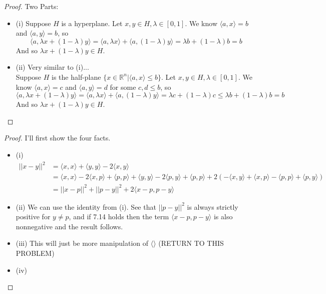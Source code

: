 \documentclass[12pt]{article}
\newenvironment{problem}[2][Problem]{\begin{trivlist}
\item[\hskip \labelsep {\bfseries #1}\hskip \labelsep {\bfseries #2.}]}{\end{trivlist}}
\theoremstyle{definition}
\theoremstyle{definition}
\theoremstyle{definition}
\theoremstyle{definition}
\begin{document}
\begin{problem}{7.2} \begin{proof} Two Parts:
\begin{itemize}
\item (i)
Suppose $H$ is a hyperplane. Let $x, y \in H, \lambda \in [0,1]$. We know $\langle a, x \rangle = b$ and $\langle a, y \rangle = b$, so 
$$ \langle a, \lambda x + (1 - \lambda) y \rangle = \langle a, \lambda x \rangle + \langle a, (1 - \lambda)y \rangle = \lambda b + (1 - \lambda) b = b
$$
And so $\lambda x + (1-\lambda) y \in H$.
\item (ii) Very similar to (i)... \\
Suppose $H$ is the half-plane $\{ x \in \mathbb{R}^n | \langle a, x \rangle \leq b\}$. Let $x, y \in H, \lambda \in [0,1]$. We know $\langle a, x \rangle = c$ and $\langle a, y \rangle = d$ for some $c, d \leq b$, so 
$$ \langle a, \lambda x + (1 - \lambda) y \rangle = \langle a, \lambda x \rangle + \langle a, (1 - \lambda)y \rangle = \lambda c + (1 - \lambda) c \leq \lambda b + (1 - \lambda) b = b
$$
And so $\lambda x + (1-\lambda) y \in H$.
\end{itemize}
\end{proof}
\end{problem}

\begin{problem}{7.4}
\begin{proof} I'll first show the four facts.
\begin{itemize}
\item (i) 
\begin{align*}
||x - y||^2 &= \langle x, x \rangle + \langle y, y \rangle - 2\langle x, y \rangle \\
&= \langle x, x \rangle - 2\langle x, p \rangle + \langle p,p \rangle + \langle y, y \rangle - 2\langle p, y \rangle + \langle p,p \rangle + 2(-\langle x, y \rangle +  \langle x, p \rangle - \langle p, p \rangle + \langle p, y \rangle) \\
&= ||x - p||^2 + ||p-y||^2 + 2\langle x - p, p-y \rangle 
\end{align*}
\item (ii) We can use the identity from (i). See that $||p-y||^2$ is always strictly positive for $ y \neq p$, and if 7.14 holds then the term $\langle x-p, p-y \rangle$ is also nonnegative and the result follows.
\item (iii)
This will just be more manipulation of $\langle \rangle $ (RETURN TO THIS PROBLEM)
\item (iv)
\end{itemize}
\end{proof}
\end{problem}
\end{document}
